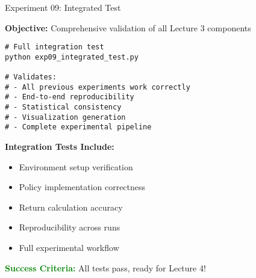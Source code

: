 \documentclass[aspectratio=169,10pt]{beamer}
\begin{document}
\begin{frame}[fragile]{Experiment 09: Integrated Test}

\textbf{Objective:} Comprehensive validation of all Lecture 3 components

\begin{lstlisting}
# Full integration test
python exp09_integrated_test.py

# Validates:
# - All previous experiments work correctly
# - End-to-end reproducibility 
# - Statistical consistency
# - Visualization generation
# - Complete experimental pipeline
\end{lstlisting}

\vfill

\textbf{Integration Tests Include:}
\begin{itemize}
    \item Environment setup verification
    \item Policy implementation correctness
    \item Return calculation accuracy
    \item Reproducibility across runs
    \item Full experimental workflow
\end{itemize}

\vfill

\textcolor{green}{\textbf{Success Criteria:}} All tests pass, ready for Lecture 4!

\end{frame}
\end{document}
